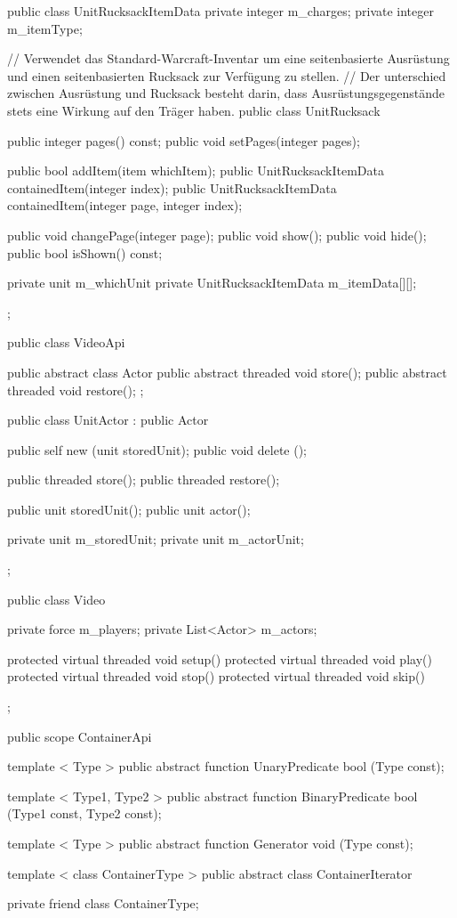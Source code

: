 {{		public class UnitRucksackItemData
		{
			private integer m_charges;
			private integer m_itemType;
		}

		// Verwendet das Standard-Warcraft-Inventar um eine seitenbasierte Ausrüstung und einen seitenbasierten Rucksack zur Verfügung zu stellen.
		// Der unterschied zwischen Ausrüstung und Rucksack besteht darin, dass Ausrüstungsgegenstände stets eine Wirkung auf den Träger haben.
		public class UnitRucksack
		{
			public integer pages() const;
			public void setPages(integer pages);

			public bool addItem(item whichItem);
			public UnitRucksackItemData containedItem(integer index);
			public UnitRucksackItemData containedItem(integer page, integer index);

			public void changePage(integer page);
			public void show();
			public void hide();
			public bool isShown() const;

			private unit m_whichUnit
			private UnitRucksackItemData m_itemData[][];
		};
	}

	public class VideoApi
	{
		public abstract class Actor
		{
			public abstract threaded void store();
			public abstract threaded void restore();
		};

		public class UnitActor : public Actor
		{
			public self new (unit storedUnit);
			public void delete ();

			public threaded store();
			public threaded restore();

			public unit storedUnit();
			public unit actor();

			private unit m_storedUnit;
			private unit m_actorUnit;
		};


		public class Video
		{
			private force m_players;
			private List<Actor> m_actors;

			protected virtual threaded void setup()
			protected virtual threaded void play()
			protected virtual threaded void stop()
			protected virtual threaded void skip()
		};
	}

	public scope ContainerApi
	{
		template < Type >
		public abstract function UnaryPredicate bool (Type const);

		template < Type1, Type2 >
		public abstract function BinaryPredicate bool (Type1 const, Type2 const);

		template < Type >
		public abstract function Generator void (Type const);

		template < class ContainerType >
		public abstract class ContainerIterator
		{
			private friend class ContainerType;

}}}
